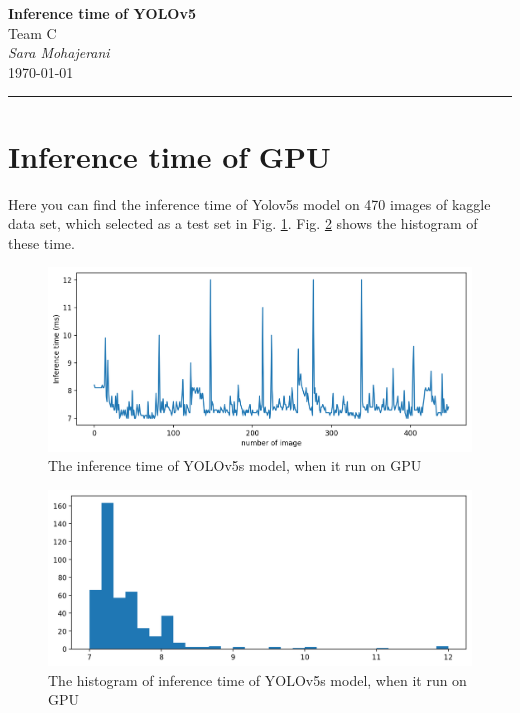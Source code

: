 \documentclass[12pt,a4paper]{article}
\begin{document}
\textcolor{UM_Brown}{
\begin{minipage}{0.8\textwidth}
    \begin{center}
        \textbf{\Large Inference time of YOLOv5}\\
        \vspace{5pt}
        Team C \\
        \vspace{20pt}
        \textit{Sara Mohajerani} \\
        \vspace{5pt}
        \today
    \end{center}
\end{minipage}
\vspace{10pt}
\hrule
}



\section*{Inference time of GPU}
Here you can find the inference time of Yolov5s model on 470 images of kaggle data set, which selected as a test set in Fig. \ref{fig: gpu}. Fig. \ref{fig: gpu_hist} shows the histogram of these time.
\begin{figure}[H]
    \centering
    \includegraphics[width=15cm]{figures/GPU_infTime.png}
    \caption{The inference time of YOLOv5s model, when it run on GPU}
    \label{fig: gpu}
\end{figure}
\begin{figure}[H]
    \centering
    \includegraphics[width=15cm]{figures/GPU_infTime_his.png}
    \caption{The histogram of inference time of YOLOv5s model, when it run on GPU}
    \label{fig: gpu_hist}
\end{figure}
\end{document}
